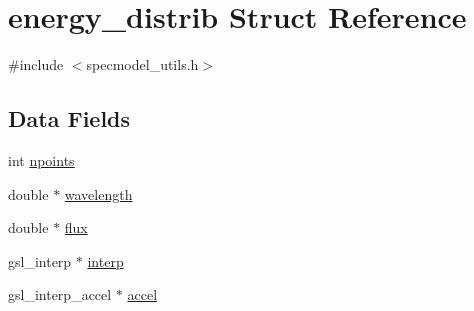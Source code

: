 \hypertarget{structenergy__distrib}{
\section{energy\_\-distrib Struct Reference}
\label{structenergy__distrib}
}


{\ttfamily \#include $<$specmodel\_\-utils.h$>$}\subsection*{Data Fields}
\begin{DoxyCompactItemize}
\item 
int \hyperlink{structenergy__distrib_ae5e24fde4a41b46a8b8510118f646e67}{npoints}
\item 
double $\ast$ \hyperlink{structenergy__distrib_ac32d12647e9ef7f158b0d4532c09a568}{wavelength}
\item 
double $\ast$ \hyperlink{structenergy__distrib_a7da8059a7bb2f8af463b6ee1dd1e6554}{flux}
\item 
gsl\_\-interp $\ast$ \hyperlink{structenergy__distrib_a3d90efb6bd5ace3c19884613063644af}{interp}
\item 
gsl\_\-interp\_\-accel $\ast$ \hyperlink{structenergy__distrib_a7d0d556a145bd34158514bdbab57b0ee}{accel}
\end{DoxyCompactItemize}


